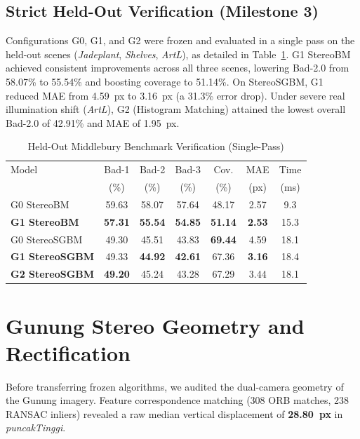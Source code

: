 \documentclass[journal]{IEEEtran}
\begin{document}
\subsection{Strict Held-Out Verification (Milestone 3)}
Configurations G0, G1, and G2 were frozen and evaluated in a single pass on the held-out scenes (\textit{Jadeplant}, \textit{Shelves}, \textit{ArtL}), as detailed in Table~\ref{tab:heldout}. G1 StereoBM achieved consistent improvements across all three scenes, lowering Bad-2.0 from 58.07\% to 55.54\% and boosting coverage to 51.14\%. On StereoSGBM, G1 reduced MAE from 4.59~px to 3.16~px (a 31.3\% error drop). Under severe real illumination shift (\textit{ArtL}), G2 (Histogram Matching) attained the lowest overall Bad-2.0 of 42.91\% and MAE of 1.95~px.

\begin{table}[t]
\caption{Held-Out Middlebury Benchmark Verification (Single-Pass)}
\label{tab:heldout}
\centering
\begin{tabular}{lcccccc}
\toprule
Model & Bad-1 & Bad-2 & Bad-3 & Cov. & MAE & Time \\
& (\%) & (\%) & (\%) & (\%) & (px) & (ms) \\
\midrule
G0 StereoBM & 59.63 & 58.07 & 57.64 & 48.17 & 2.57 & 9.3 \\
\textbf{G1 StereoBM} & \textbf{57.31} & \textbf{55.54} & \textbf{54.85} & \textbf{51.14} & \textbf{2.53} & 15.3 \\
G0 StereoSGBM & 49.30 & 45.51 & 43.83 & \textbf{69.44} & 4.59 & 18.1 \\
\textbf{G1 StereoSGBM} & 49.33 & \textbf{44.92} & \textbf{42.61} & 67.36 & \textbf{3.16} & 18.4 \\
\textbf{G2 StereoSGBM} & \textbf{49.20} & 45.24 & 43.28 & 67.29 & 3.44 & 18.1 \\
\bottomrule
\end{tabular}
\end{table}

\section{Gunung Stereo Geometry and Rectification}
Before transferring frozen algorithms, we audited the dual-camera geometry of the Gunung imagery. Feature correspondence matching (308 ORB matches, 238 RANSAC inliers) revealed a raw median vertical displacement of \textbf{28.80~px} in \textit{puncakTinggi}.
\end{document}
